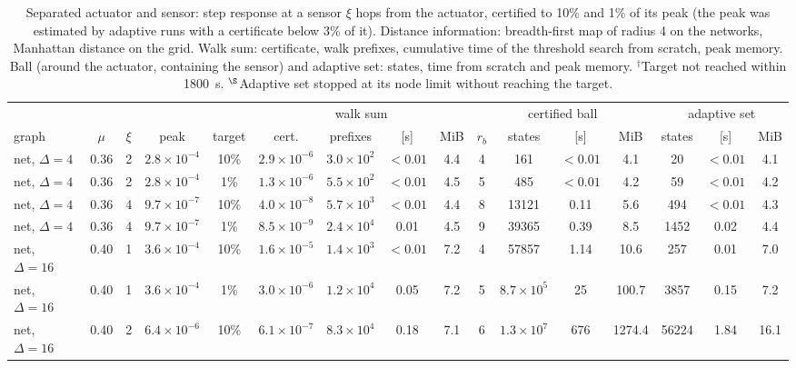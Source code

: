 \documentclass[aps,pra,superscriptaddress,floatfix,longbibliography,twocolumn]{revtex4-2}
\begin{document}
\begin{table}[t]
\footnotesize\setlength{\tabcolsep}{2.6pt}
\caption{Separated actuator and sensor: step response at a sensor $\xi$ hops from the actuator, certified to 10\% and 1\% of its peak (the peak was estimated by adaptive runs with a certificate below 3\% of it). Distance information: breadth-first map of radius 4 on the networks, Manhattan distance on the grid. Walk sum: certificate, walk prefixes, cumulative time of the threshold search from scratch, peak memory. Ball (around the actuator, containing the sensor) and adaptive set: states, time from scratch and peak memory. $^\dagger$Target not reached within 1800~s. $^\S$Adaptive set stopped at its node limit without reaching the target.}\label{tab:noncol}
\begin{ruledtabular}
\begin{tabular}{lcccc|cccc|cccc|ccc}
 & & & & & \multicolumn{4}{c|}{walk sum} & \multicolumn{4}{c|}{certified ball} & \multicolumn{3}{c}{adaptive set}\\
graph & $\mu$ & $\xi$ & peak & target & cert. & prefixes & [s] & MiB & $r_b$ & states & [s] & MiB & states & [s] & MiB\\\hline
net, $\Delta=4$ & 0.36 & 2 & $2.8\times10^{-4}$ & 10\% & $2.9\times10^{-6}$ & $3.0\times10^{2}$ & $<0.01$ & 4.4 & 4 & 161 & $<0.01$ & 4.1 & 20 & $<0.01$ & 4.1 \\
net, $\Delta=4$ & 0.36 & 2 & $2.8\times10^{-4}$ & 1\% & $1.3\times10^{-6}$ & $5.5\times10^{2}$ & $<0.01$ & 4.5 & 5 & 485 & $<0.01$ & 4.2 & 59 & $<0.01$ & 4.2 \\
net, $\Delta=4$ & 0.36 & 4 & $9.7\times10^{-7}$ & 10\% & $4.0\times10^{-8}$ & $5.7\times10^{3}$ & $<0.01$ & 4.4 & 8 & 13121 & 0.11 & 5.6 & 494 & $<0.01$ & 4.3 \\
net, $\Delta=4$ & 0.36 & 4 & $9.7\times10^{-7}$ & 1\% & $8.5\times10^{-9}$ & $2.4\times10^{4}$ & 0.01 & 4.5 & 9 & 39365 & 0.39 & 8.5 & 1452 & 0.02 & 4.4 \\
net, $\Delta=16$ & 0.40 & 1 & $3.6\times10^{-4}$ & 10\% & $1.6\times10^{-5}$ & $1.4\times10^{3}$ & $<0.01$ & 7.2 & 4 & 57857 & 1.14 & 10.6 & 257 & 0.01 & 7.0 \\
net, $\Delta=16$ & 0.40 & 1 & $3.6\times10^{-4}$ & 1\% & $3.0\times10^{-6}$ & $1.2\times10^{4}$ & 0.05 & 7.2 & 5 & $8.7\times10^{5}$ & 25 & 100.7 & 3857 & 0.15 & 7.2 \\
net, $\Delta=16$ & 0.40 & 2 & $6.4\times10^{-6}$ & 10\% & $6.1\times10^{-7}$ & $8.3\times10^{4}$ & 0.18 & 7.1 & 6 & $1.3\times10^{7}$ & 676 & 1274.4 & 56224 & 1.84 & 16.1 \\

\end{tabular}
\end{ruledtabular}
\end{table}
\end{document}
